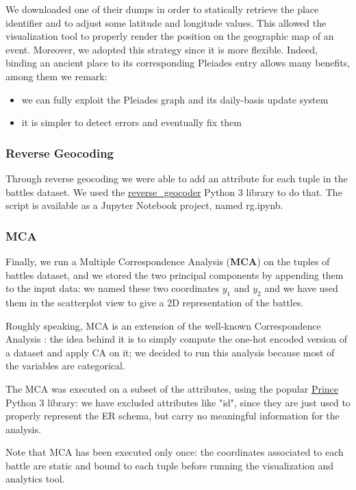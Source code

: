 We downloaded one of their dumps in order to statically retrieve the place identifier and to adjust some latitude and longitude values. This allowed the visualization tool to properly render the position on the geographic map of an event. Moreover, we adopted this strategy since it is more flexible. Indeed, binding an ancient place to its corresponding Pleiades entry allows many benefits, among them we remark:
\begin{itemize}
    \item we can fully exploit the Pleiades graph and its daily-basis update system
    \item it is simpler to detect errors and eventually fix them
\end{itemize}

\subsubsection{Reverse Geocoding}
Through reverse geocoding we were able to add an attribute for each tuple in the battles dataset. We used the \href{https://pypi.org/project/reverse_geocoder/}{reverse\_geocoder} Python 3 library to do that. The script is available as a Jupyter Notebook project, named rg.ipynb.

\subsubsection{MCA}
Finally, we run a Multiple Correspondence Analysis (\textbf{MCA}) \cite{HD07} on the tuples of battles dataset, and we stored the two principal components by appending them to the input data: we named these two coordinates $y_1$ and $y_2$ and we have used them in the scatterplot view to give a 2D representation of the battles.

Roughly speaking, MCA is an extension of the well-known Correspondence Analysis \cite{Hill74}: the idea behind it is to simply compute the one-hot encoded version of a dataset and apply CA on it; we decided to run this analysis because most of the variables are categorical.

The MCA was executed on a subset of the attributes, using the popular \href{https://pypi.org/project/prince}{Prince} Python 3 library: we have excluded attributes like "id", since they are just used to properly represent the ER schema, but carry no meaningful information for the analysis.

Note that MCA has been executed only once: the coordinates associated to each battle are static and bound to each tuple before running the visualization and analytics tool.


